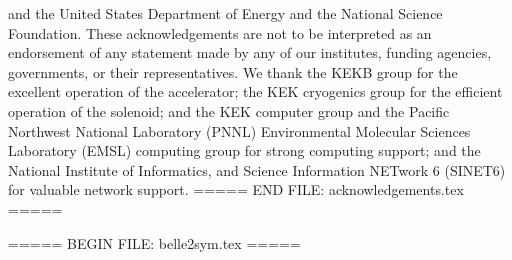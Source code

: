 and the United States Department of Energy and the National Science Foundation.
These acknowledgements are not to be interpreted as an endorsement of any
statement made by any of our institutes, funding agencies, governments, or
their representatives.
We thank the KEKB group for the excellent operation of the
accelerator; the KEK cryogenics group for the efficient
operation of the solenoid; and the KEK computer group and the Pacific Northwest National
Laboratory (PNNL) Environmental Molecular Sciences Laboratory (EMSL)
computing group for strong computing support; and the National
Institute of Informatics, and Science Information NETwork 6 (SINET6) for
valuable network support.
===== END FILE: acknowledgements.tex =====

===== BEGIN FILE: belle2sym.tex =====






\RequirePackage{xspace}


\def\belletwo {Belle~II}





\let\emi\en
\def\electron   {\ensuremath{e}\xspace}
\def\en         {\ensuremath{e^-}\xspace}
\def\ep         {\ensuremath{e^+}\xspace}
\def\epm        {\ensuremath{e^\pm}\xspace}
\def\epem       {\ensuremath{e^+e^-}\xspace}
\def\ee         {\ensuremath{e^-e^-}\xspace}

\def\mmu        {\ensuremath{\mu}\xspace}
\def\mup        {\ensuremath{\mu^+}\xspace}
\def\mun        {\ensuremath{\mu^-}\xspace}
\def\mumu       {\ensuremath{\mu^+\mu^-}\xspace}
\def\mtau       {\ensuremath{\tau}\xspace}

\def\taup       {\ensuremath{\tau^+}\xspace}
\def\taum       {\ensuremath{\tau^-}\xspace}
\def\tautau     {\ensuremath{\tau^+\tau^-}\xspace}

\def\ellm       {\ensuremath{\ell^-}\xspace}
\def\ellp       {\ensuremath{\ell^+}\xspace}
\def\ellell     {\ensuremath{\ell^+ \ell^-}\xspace}

\def\nub        {\ensuremath{\overline{\nu}}\xspace}
\def\nunub      {\ensuremath{\nu{\overline{\nu}}}\xspace}
\def\nub        {\ensuremath{\overline{\nu}}\xspace}
\def\nunub      {\ensuremath{\nu{\overline{\nu}}}\xspace}
\def\nue        {\ensuremath{\nu_e}\xspace}
\def\nueb       {\ensuremath{\nub_e}\xspace}
\def\nuenueb    {\ensuremath{\nue\nueb}\xspace}
\def\num        {\ensuremath{\nu_\mu}\xspace}
\def\numb       {\ensuremath{\nub_\mu}\xspace}
\def\numnumb    {\ensuremath{\num\numb}\xspace}
\def\nut        {\ensuremath{\nu_\tau}\xspace}
\def\nutb       {\ensuremath{\nub_\tau}\xspace}
\def\nutnutb    {\ensuremath{\nut\nutb}\xspace}
\def\nul        {\ensuremath{\nu_\ell}\xspace}
\def\nulb       {\ensuremath{\nub_\ell}\xspace}
\def\nulnulb    {\ensuremath{\nul\nulb}\xspace}





